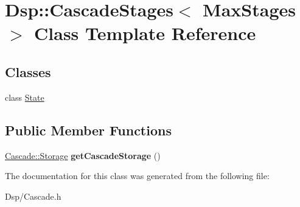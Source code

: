 \hypertarget{classDsp_1_1CascadeStages}{\section{Dsp\-:\-:Cascade\-Stages$<$ Max\-Stages $>$ Class Template Reference}
\label{classDsp_1_1CascadeStages}
}
\subsection*{Classes}
\begin{DoxyCompactItemize}
\item 
class \hyperlink{classDsp_1_1CascadeStages_1_1State}{State}
\end{DoxyCompactItemize}
\subsection*{Public Member Functions}
\begin{DoxyCompactItemize}
\item 
\hypertarget{classDsp_1_1CascadeStages_a7c44cd91611ad4274524ac24fb97d4c9}{\hyperlink{structDsp_1_1Cascade_1_1Storage}{Cascade\-::\-Storage} {\bfseries get\-Cascade\-Storage} ()}\label{classDsp_1_1CascadeStages_a7c44cd91611ad4274524ac24fb97d4c9}

\end{DoxyCompactItemize}


The documentation for this class was generated from the following file\-:\begin{DoxyCompactItemize}
\item 
Dsp/Cascade.\-h\end{DoxyCompactItemize}
